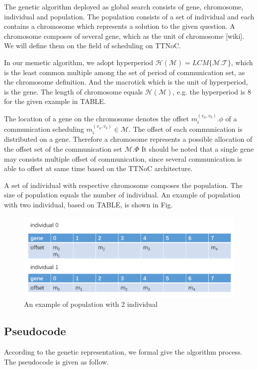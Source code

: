 \documentclass[journal]{IEEEtran}
\begin{document}
The genetic algorithm deployed as global search consists of gene, chromosome, individual and population. The population consists of a set of individual and each contains a chromosome which represents a solution to the given question. A chromosome composes of several gene, which as the unit of chromosome [wiki]. We will define them on the field of scheduling on TTNoC.

In our memetic algorithm, we adopt hyperperiod  $\mathcal{H(M)} = LCM\{\mathcal{M.T}\}$, which is the least common multiple among the set of period of communication set, as the chromosome definition. And the macrotick which is the unit of hyperperiod, is the gene. The length of chromosome equals $\mathcal{H(M)}$, e.g. the hyperperiod is 8 for the given example in TABLE. 

The location of a gene on the chromosome denotes the offset $ m_{i}^{(v_{a},v_{b})}.\phi $ of a communication scheduling $ {m_{i}^{(v_{a},v_{b})}\in\mathcal{M}} $. The offset of each communication is distributed on a gene. Therefore a chromosome represents a possible allocation of the offset set of the communication set $\mathcal{M}.\Phi$ It should be noted that a single gene may consists multiple offset of communication, since several communication is able to offset at same time based on the TTNoC architecture.

A set of individual with respective chromosome composes the population. The size of population equals the number of individual. An example of population with two individual, based on TABLE, is shown in Fig.

\begin{figure}[!t]
	\centering
	\includegraphics[width=3 in]{picture/2individual}
	\caption{An example of population with 2 individual}
	\label{f:indi}
\end{figure}

\subsection{Pseudocode}

According to the genetic representation, we formal give the algorithm process. The pseudocode is given as follow.
\end{document}
